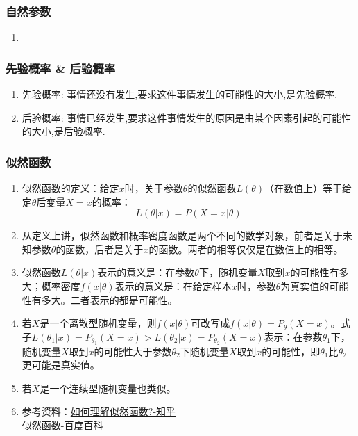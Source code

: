 \subsubsection{自然参数}
\begin{enumerate}
	\item {\color{red}{待补充}}
\end{enumerate}

\subsubsection{先验概率 \& 后验概率}
\begin{enumerate}
	\item 先验概率: 事情还没有发生,要求这件事情发生的可能性的大小,是先验概率. 
	\item 后验概率: 事情已经发生,要求这件事情发生的原因是由某个因素引起的可能性的大小,是后验概率.
\end{enumerate}

\subsubsection{似然函数}
\begin{enumerate}
	\item 似然函数的定义：给定$x$时，关于参数$\theta$的似然函数$L(\theta)$（在数值上）等于给定$\theta$后变量$X=x$的概率：
	\begin{equation}
		L(\theta|x) = P(X=x|\theta)
	\end{equation}
	\item 从定义上讲，似然函数和概率密度函数是两个不同的数学对象，前者是关于未知参数$\theta$的函数，后者是关于$x$的函数。两者的相等仅仅是在数值上的相等。
	\item 似然函数$L(\theta|x)$表示的意义是：在参数$\theta$下，随机变量$X$取到$x$的可能性有多大；概率密度$f(x|\theta)$表示的意义是：在给定样本$x$时，参数$\theta$为真实值的可能性有多大。二者表示的都是可能性。
	\item 若$X$是一个离散型随机变量，则$f(x|\theta)$可改写成$f(x|\theta)=P_\theta(X=x)$。式子$L(\theta_1|x)=P_{\theta_1}(X=x) > L(\theta_2|x)=P_{\theta_2}(X=x)$表示：在参数$\theta_1$下，随机变量$X$取到$x$的可能性大于参数$\theta_2$下随机变量$X$取到$x$的可能性，即$\theta_1$比$\theta_2$更可能是真实值。
	\item 若$X$是一个连续型随机变量也类似。
	\item 参考资料：\href{https://www.zhihu.com/question/54082000}{如何理解似然函数?-知乎} \\
	\href{http://baike.baidu.com/subview/1864828/1864828.htm}{似然函数-百度百科}
\end{enumerate}

